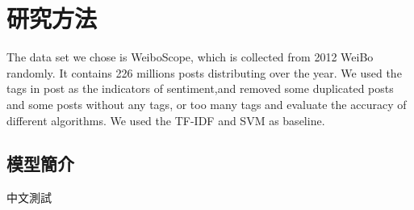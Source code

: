 \chapter{研究方法}

The data set we chose is WeiboScope, which is collected from 2012 WeiBo randomly. It contains 226 millions posts distributing over the year. We used the tags in post as the indicators of sentiment,and removed some duplicated posts and some posts without any tags, or too many tags and evaluate the accuracy of different algorithms.  We used the TF-IDF and SVM as baseline.

\section{模型簡介}

中文測試
